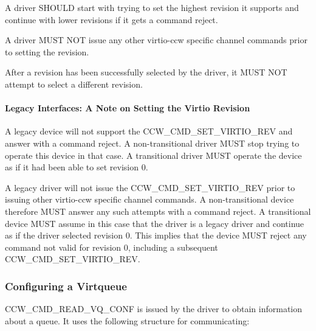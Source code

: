 
A driver SHOULD start with trying to set the highest revision it
supports and continue with lower revisions if it gets a command reject.

A driver MUST NOT issue any other virtio-ccw specific channel commands
prior to setting the revision.

After a revision has been successfully selected by the driver, it
MUST NOT attempt to select a different revision.

\paragraph{Legacy Interfaces: A Note on Setting the Virtio Revision}\label{sec:Virtio Transport Options / Virtio over channel I/O / Device Initialization / Setting the Virtio Revision / Legacy Interfaces: A Note on Setting the Virtio Revision}

A legacy device will not support the CCW_CMD_SET_VIRTIO_REV and answer
with a command reject. A non-transitional driver MUST stop trying to
operate this device in that case. A transitional driver MUST operate
the device as if it had been able to set revision 0.

A legacy driver will not issue the CCW_CMD_SET_VIRTIO_REV prior to
issuing other virtio-ccw specific channel commands. A non-transitional
device therefore MUST answer any such attempts with a command reject.
A transitional device MUST assume in this case that the driver is a
legacy driver and continue as if the driver selected revision 0. This
implies that the device MUST reject any command not valid for revision
0, including a subsequent CCW_CMD_SET_VIRTIO_REV.

\subsubsection{Configuring a Virtqueue}\label{sec:Virtio Transport Options / Virtio over channel I/O / Device Initialization / Configuring a Virtqueue}

CCW_CMD_READ_VQ_CONF is issued by the driver to obtain information
about a queue. It uses the following structure for communicating:

